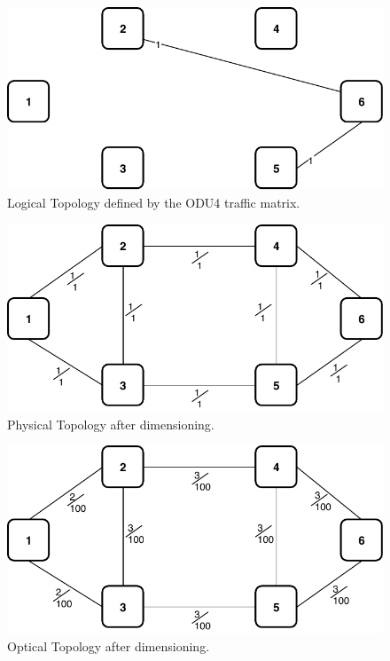 \begin{figure}[h!]
\centering
\includegraphics[width=12cm]{sdf/ilp/opaque_protection/figures/logical_topology_ODU4_low}
\caption{Logical Topology defined by the ODU4 traffic matrix.}
\label{logical_ODU4_protectionlow}
\end{figure}

\begin{figure}[h!]
\centering
\includegraphics[width=13cm]{sdf/ilp/opaque_protection/figures/physical_topology}
\caption{Physical Topology after dimensioning.}
\label{physical_protectionlow}
\end{figure}

\vspace{17pt}

\begin{figure}[h!]
\centering
\includegraphics[width=13cm]{sdf/ilp/opaque_protection/figures/optical_topology_low}
\caption{Optical Topology after dimensioning.}
\label{optical_protectionlow}
\end{figure}

